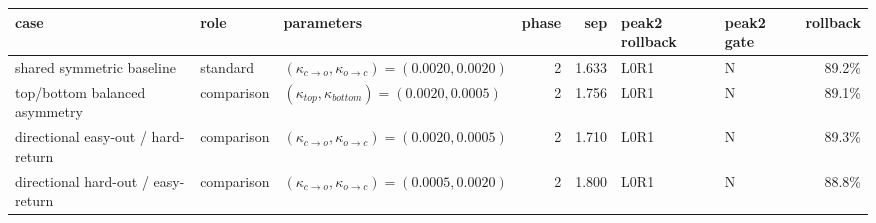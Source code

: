 \begin{tabular}{lllrrllr}
\toprule
case & role & parameters & phase & sep & peak2 rollback & peak2 gate & rollback \\
\midrule
shared symmetric baseline & standard & $(\kappa_{c\to o},\kappa_{o\to c})=(0.0020,0.0020)$ & 2 & 1.633 & L0R1 & N & 89.2\% \\
top/bottom balanced asymmetry & comparison & $(\kappa_{top},\kappa_{bottom})=(0.0020,0.0005)$ & 2 & 1.756 & L0R1 & N & 89.1\% \\
directional easy-out / hard-return & comparison & $(\kappa_{c\to o},\kappa_{o\to c})=(0.0020,0.0005)$ & 2 & 1.710 & L0R1 & N & 89.3\% \\
directional hard-out / easy-return & comparison & $(\kappa_{c\to o},\kappa_{o\to c})=(0.0005,0.0020)$ & 2 & 1.800 & L0R1 & N & 88.8\% \\
\bottomrule
\end{tabular}
